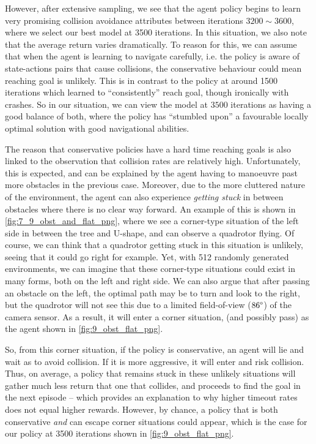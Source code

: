 However, after extensive sampling, we see that the agent policy begins to learn very promising collision avoidance attributes between iterations $3200 \sim 3600$, where we select our best model at 3500 iterations. In this situation, we also note that the average return varies dramatically. To reason for this, we can assume that when the agent is learning to navigate carefully, i.e. the policy is aware of state-actions pairs that cause collisions, the conservative behaviour could mean reaching goal is unlikely. This is in contrast to the policy at around 1500 iterations which learned to ``consistently'' reach goal, though ironically with crashes. So in our situation, we can view the model at $3500$ iterations as having a good balance of both, where the policy has ``stumbled upon'' a favourable locally optimal solution with good navigational abilities.

The reason that conservative policies have a hard time reaching goals is also linked to the observation that collision rates are relatively high. Unfortunately, this is expected, and can be explained by the agent having to manoeuvre past more obstacles in the previous case. Moreover, due to the more cluttered nature of the environment, the agent can also experience \textit{getting stuck} in between obstacles where there is no clear way forward.
An example of this is shown in \cref{fig:7_9_obst_and_flat_png}, where we see a corner-type situation of the left side in between the tree and U-shape, and can observe a quadrotor flying. Of course, we can think that a quadrotor getting stuck in this situation is unlikely, seeing that it could go right for example. Yet, with 512 randomly generated environments, we can imagine that these corner-type situations could exist in many forms, both on the left and right side. We can also argue that after passing an obstacle on the left, the optimal path may be to turn and look to the right, but the quadrotor will not see this due to a limited field-of-view ($86\degree$) of the camera sensor. As a result, it will enter a corner situation, (and possibly pass) as the agent shown in \cref{fig:9_obst_flat_png}. 

So, from this corner situation, if the policy is conservative, an agent will lie and wait as to avoid collision. If it is more aggressive, it will enter and risk collision. Thus, on average, a policy that remains stuck in these unlikely situations will gather much less return that one that collides, and proceeds to find the goal in the next episode -- which provides an explanation to why higher timeout rates does not equal higher rewards. However, by chance, a policy that is both conservative \textit{and} can escape corner situations could appear, which is the case for our policy at 3500 iterations shown in \cref{fig:9_obst_flat_png}.


